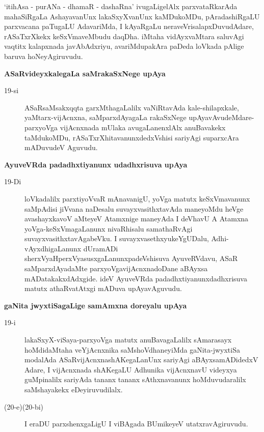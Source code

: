 \noindent
`itihAsa - purANa - dhamaR - dashaRna' ivugaLigelAlx parxvataRkarAda mahaSiRgaLa Ashaya\-vanUnx lakaSxyX\-vanUnx kaMDukoMDu, pAradashiRgaLU parxvacana paTugaLU AdavariMda, I kAyaRgaLu neraveVrisa\-lapxDu\-vu\-dAdare, rASaTxrXkekx keSxVmaveMbudu daqDha. iMtaha vidAyxvaMtara saluvAgi vaqtitx kalapxnada javA\-bAdx\-riyu, avariMdupakAra paDeda loVkada pAlige baruva hoNeyAgiruvudu.

{\bigskip
\noindent
{\large\bf ASaRvideyxkalegaLa saMrakaSxNege upAya}}\label{page50}
\begin{description}
\item[19-si] ASaRsaMsakxqqta garxMthagaLalilx vaNiRtavAda kale-shilapxkale, yaMtarx-vijAcnxna, saMparxdAyagaLa rakaSx\-Nege upAyavAvudeMdare-parxyoVga vijAcnxnada mUlaka avugaLanenxlAlx anuBavakekx taMdu\-koMDu, rASaTxrXhitavanunxdedxVshisi sariyAgi suparxcAra mADuvudeV Aguvudu.
\end{description}

{\bigskip
\noindent
{\large\bf AyuveVRda padadhxtiyanunx udadhxrisuva upAya}}\label{page50}
\begin{description}
\item[19-Di] loVkadalilx parxtiyoVvaR mAnavanigU, yoVga matutx keSxVmavanunx saMpA\-disi jiVvana naDe\-salu suvayxvasithxtavAda maneyoMdu heVge avashayxkavoV aMteyeV Atamxnige maneyAda I deVhavU A Atamxna yoVga-keSxVma\-gaLanunx nivaRhisalu samathaRvAgi suvayxvasithxtavAgabeVku. I suvayxva\-sethxyu\break keY\-gUDalu, Adhi-vAyxdhigaLanunx dUramADi sherxVyaHperxVyasusxgaLanunxpa\-deVshi\-suva Ayu\-veRVdavu, ASaR saMparxdAyadaMte parxyoVgavijAcnxnadoDane aBAyxsa mADatakakxdAdxgide. ideV AyuveVRda padadhxtiyanunxdadhxrisuva matutx athaRvatAtxgi mADuva upAyavAguvudu.
\end{description}

\newpage

{\bigskip
\noindent
{\large\bf gaNita jwyxtiSagaLige samAmxna doreyalu upAya}}\label{page51}
\begin{description}
\item[19-i] lakaSxyX-viSaya-parxyoVga matutx anuBavagaLalilx sAmarasayx hoMdidaMtaha veYjAcnxnika saMshoV\-dhaneyiMda gaNita-jwyxtiSa modalAda \hbox{ASaRvijAcnxna}\break shAKegaLanUnx sariyAgi aBAyxsamADidedxV Adare, I vijAcnxnada shAKegaLU Adhunika vijAcnxnavU videyxya guMpinalilx sariyAda tananx tananx sAthxnavanunx hoMdu\-vudaralilx saMshayakekx eDeyiruvudilalx.

\item[(20-e)(20-bi)] I eraDU parxshenxgaLigU I viBAgada BUmikeyeV utatxra\-vAgiruvudu.
\end{description}

